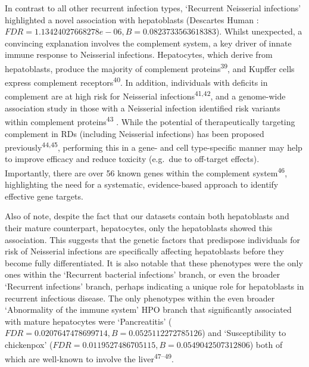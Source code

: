 \documentclass[
]{article}
\begin{document}
In contrast to all other recurrent infection types, `Recurrent
Neisserial infections' highlighted a novel association with hepatoblasts
(Descartes Human : \(FDR=1.13424027668278e-06,B=0.0823733563618383\)).
Whilst unexpected, a convincing explanation involves the complement
system, a key driver of innate immune response to Neisserial infections.
Hepatocytes, which derive from hepatoblasts, produce the majority of
complement proteins\textsuperscript{39}, and Kupffer cells express
complement receptors\textsuperscript{40}. In addition, individuals with
deficits in complement are at high risk for Neisserial
infections\textsuperscript{41,42}, and a genome-wide association study
in those with a Neisserial infection identified risk variants within
complement proteins\textsuperscript{43} . While the potential of
therapeutically targeting complement in RDs (including Neisserial
infections) has been proposed previously\textsuperscript{44,45},
performing this in a gene- and cell type-specific manner may help to
improve efficacy and reduce toxicity (e.g.~due to off-target effects).
Importantly, there are over 56 known genes within the complement
system\textsuperscript{46}, highlighting the need for a systematic,
evidence-based approach to identify effective gene targets.

Also of note, despite the fact that our datasets contain both
hepatoblasts and their mature counterpart, hepatocytes, only the
hepatoblasts showed this association. This suggests that the genetic
factors that predispose individuals for risk of Neisserial infections
are specifically affecting hepatoblasts before they become fully
differentiated. It is also notable that these phenotypes were the only
ones within the `Recurrent bacterial infections' branch, or even the
broader `Recurrent infections' branch, perhaps indicating a unique role
for hepatoblasts in recurrent infectious disease. The only phenotypes
within the even broader `Abnormality of the immune system' HPO branch
that significantly associated with mature hepatocytes were
`Pancreatitis' (\(FDR=0.0207647478699714,B=0.0525112272785126\)) and
`Susceptibility to chickenpox'
(\(FDR=0.0119527486705115,B=0.0549042507312806\)) both of which are
well-known to involve the liver\textsuperscript{47--49}.
\end{document}
